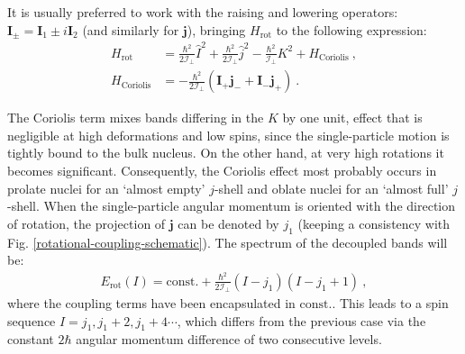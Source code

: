 It is usually preferred to work with the raising and lowering operators: $\mathbf{I}_\pm=\mathbf{I}_1\pm i \mathbf{I}_2$ (and similarly for $\mathbf{j}$), bringing $H_\text{rot}$ to the following expression:
\begin{align}
    H_\text{rot}&=\frac{\hbar^2}{2\mathcal{I}_\perp}\hat{I}^2+\frac{\hbar^2}{2\mathcal{I}_\perp}\hat{j}^2-\frac{\hbar^2}{\mathcal{I}_\perp}K^2+H_\text{Coriolis}\ ,\\
    H_\text{Coriolis}&=-\frac{\hbar^2}{2\mathcal{I}_\perp}(\mathbf{I}_+\mathbf{j}_-+\mathbf{I}_-\mathbf{j}_+)\ .
\end{align}

The Coriolis term mixes bands differing in the $K$ by one unit, effect that is negligible at high deformations and low spins, since the single-particle motion is tightly bound to the bulk nucleus. On the other hand, at very high rotations it becomes significant. Consequently, the Coriolis effect most probably occurs in prolate nuclei for an `almost empty' $j$-shell and oblate nuclei for an `almost full' $j$-shell. When the single-particle angular momentum is oriented with the direction of rotation, the projection of $\mathbf{j}$ can be denoted by $j_1$ (keeping a consistency with Fig. \ref{rotational-coupling-schematic}). The spectrum of the decoupled bands will be:
\begin{align}
    E_\text{rot}(I)=\text{const.}+\frac{\hbar^2}{2\mathcal{I}_\perp}(I-j_1)(I-j_1+1)\ ,
\end{align}
where the coupling terms have been encapsulated in $\text{const.}$. This leads to a spin sequence $I=j_1,j_1+2,j_1+4\cdots$, which differs from the previous case via the constant $2\hbar$ angular momentum difference of two consecutive levels.


